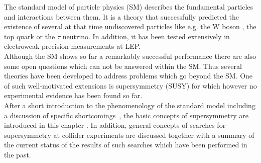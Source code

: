 The standard model of particle physics (SM) describes the fundamental particles and interactions between them. It is a theory that successfully predicted the existence of several at that time undiscovered particles like e.g. the W boson , the top quark or the $\tau$ neutrino. In addition, it has been tested extensively in electroweak precision measurements at LEP. \\
Although the SM shows so far a remarkably successful performance there are also some open questions which can not be answered within the SM. Thus several theories have been developed to address problems which go beyond the SM. One of such well-motivated extensions is supersymmetry (SUSY) for which however no experimental evidence has been found so far. \\
After a short introduction to the phenomenology of the standard model including a discussion of specific shortcomings~\cite{bib:PDG:2012}, the basic concepts of supersymmetry are introduced in this chapter . In addition, general concepts of searches for supersymmetry at collider experiments are discussed together with a summary of the current status of the results of such searches which have been performed in the past.
